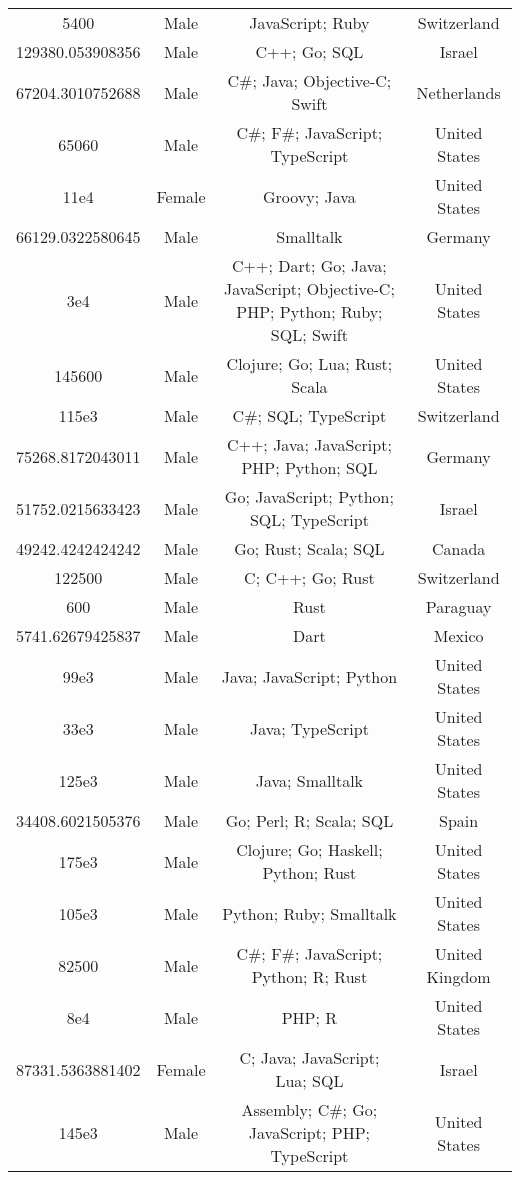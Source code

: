 \begin{center}
\begin{tabular}{ |c|c|c|c| }
5400  &  Male  &  JavaScript; Ruby  &  Switzerland  \\ 
129380.053908356  &  Male  &  C++; Go; SQL  &  Israel  \\ 
67204.3010752688  &  Male  &  C\#; Java; Objective-C; Swift  &  Netherlands  \\ 
65060  &  Male  &  C\#; F\#; JavaScript; TypeScript  &  United States  \\ 
11e4  &  Female  &  Groovy; Java  &  United States  \\ 
66129.0322580645  &  Male  &  Smalltalk  &  Germany  \\ 
3e4  &  Male  &  C++; Dart; Go; Java; JavaScript; Objective-C; PHP; Python; Ruby; SQL; Swift  &  United States  \\ 
145600  &  Male  &  Clojure; Go; Lua; Rust; Scala  &  United States  \\ 
115e3  &  Male  &  C\#; SQL; TypeScript  &  Switzerland  \\ 
75268.8172043011  &  Male  &  C++; Java; JavaScript; PHP; Python; SQL  &  Germany  \\ 
51752.0215633423  &  Male  &  Go; JavaScript; Python; SQL; TypeScript  &  Israel  \\ 
49242.4242424242  &  Male  &  Go; Rust; Scala; SQL  &  Canada  \\ 
122500  &  Male  &  C; C++; Go; Rust  &  Switzerland  \\ 
600  &  Male  &  Rust  &  Paraguay  \\ 
5741.62679425837  &  Male  &  Dart  &  Mexico  \\ 
99e3  &  Male  &  Java; JavaScript; Python  &  United States  \\ 
33e3  &  Male  &  Java; TypeScript  &  United States  \\ 
125e3  &  Male  &  Java; Smalltalk  &  United States  \\ 
34408.6021505376  &  Male  &  Go; Perl; R; Scala; SQL  &  Spain  \\ 
175e3  &  Male  &  Clojure; Go; Haskell; Python; Rust  &  United States  \\ 
105e3  &  Male  &  Python; Ruby; Smalltalk  &  United States  \\ 
82500  &  Male  &  C\#; F\#; JavaScript; Python; R; Rust  &  United Kingdom  \\ 
8e4  &  Male  &  PHP; R  &  United States  \\ 
87331.5363881402  &  Female  &  C; Java; JavaScript; Lua; SQL  &  Israel  \\ 
145e3  &  Male  &  Assembly; C\#; Go; JavaScript; PHP; TypeScript  &  United States  \\ 

\end{tabular}
\end{center}
